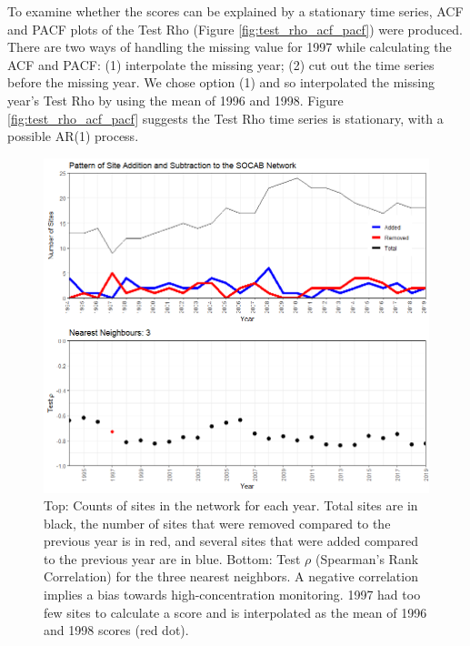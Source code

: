 \documentclass{article}
\begin{document}
To examine whether the scores can be explained by a stationary time series, ACF and PACF plots of the Test Rho (Figure \ref{fig:test_rho_acf_pacf}) were produced.  There are two ways of handling the missing value for 1997 while calculating the ACF and PACF:  (1) interpolate the missing year; (2) cut out the time series before the missing year.  We chose option (1) and so interpolated the missing year's Test Rho by using the mean of 1996 and 1998.  Figure \ref{fig:test_rho_acf_pacf} suggests the Test Rho time series is stationary, with a possible AR(1) process.  

\begin{figure}
    \centering
    \includegraphics[width = 
   \textwidth]{Figures/PreferentialSampling/PrefSmpl_nonn3combine_siteCounts_TestRho.png}
    \caption{Top:  Counts of sites in the network for each year.  Total sites are in black, the number of sites that were removed compared to the previous year is in red, and several sites that were added compared to the previous year are in blue. 
    Bottom: Test $\rho$ (Spearman's Rank Correlation) for the three nearest neighbors.  A negative correlation implies a bias towards high-concentration monitoring. 1997 had too few sites to calculate a score and is interpolated as the mean of 1996 and 1998 scores (red dot).}
    \label{fig:PS_site_counts_test_rho}
\end{figure}
\end{document}
